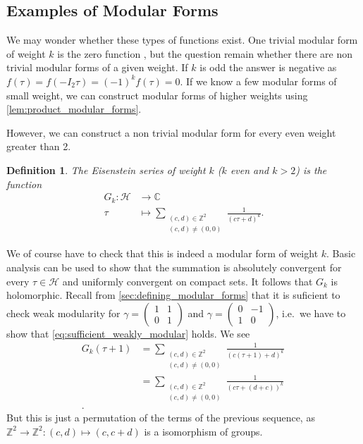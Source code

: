 \documentclass[a4paper]{article}
\theoremstyle{theoremdd}
\theoremstyle{definitiondd}
\newtheorem{definition}[theorem]{Definition}
\theoremstyle{remarkdd}
\newcommand{\Z}{\mathbb{Z}}
\newcommand{\C}{\mathbb{C}}
\begin{document}
\subsection{Examples of Modular Forms}
We may wonder whether these types of functions exist. One trivial modular form of weight $k$ is the zero function
, but the question remain whether there are non trivial modular forms of a given weight.
If $k$ is odd the answer is negative as $f(\tau) = f(-I_2 \tau) = (-1)^{k} f(\tau) = 0$. 
If we know a few modular forms of small weight, we can construct modular forms of higher weights using \cref{lem:product_modular_forms}.

However, we can construct a non trivial modular form for every even weight greater than 2.
\begin{definition}
	The \emph{Eisenstein series of weight $k$} ($k$ even and  $k >2$) is the function
	\begin{align*}
		G_k: \mathcal{H} &\longrightarrow \C \\
		\tau &\longmapsto \sum_{\substack{(c,d) \in \Z^2 \\ (c,d)\ne (0,0) }} \frac{1}{(c\tau + d)^{k}}
	.\end{align*}
\end{definition}
We of course have to check that this is indeed a modular form of weight $k$. 
Basic analysis can be used to show that the summation is absolutely convergent for every  $\tau \in \mathcal{H}$ and uniformly convergent on compact sets.
It follows that $G_k$ is holomorphic.
Recall from \cref{sec:defining_modular_forms} that it is suficient to check weak modularity for  $\gamma = \begin{pmatrix} 1 & 1 \\ 0 & 1 \end{pmatrix} $ and $\gamma = \begin{pmatrix} 0 & -1 \\ 1 & 0  \end{pmatrix} $, i.e.\ we have to show that \cref{eq:sufficient_weakly_modular} holds.
We see 
\begin{align*}
	G_k(\tau + 1) &= \sum_{\substack{(c, d) \in \Z^2 \\ (c, d) \ne (0,0)}} \frac{1}{(c (\tau + 1) + d)^{k}}\\
			 &= \sum_{\substack{(c, d) \in \Z^2 \\ (c, d) \ne (0,0)}} \frac{1}{(c \tau + (d+c))^{k}}\ \\
.\end{align*}
But this is just a permutation of the terms of the previous sequence, as $\Z^2 \to \Z^2: (c,d) \mapsto (c, c+ d)$ is a isomorphism of groups.
\end{document}
